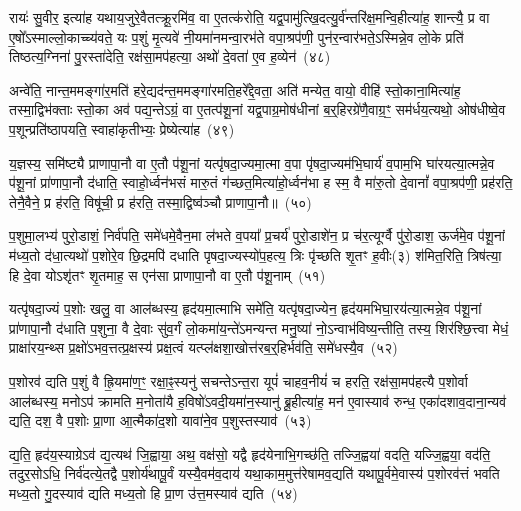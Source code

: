 रायः॑ सु॒वीर॒ इत्या॑ह यथाय॒जुरे॒वैतत्क्रू॒रमि॑व॒ वा ए॒तत्क॑रोति॒ यद्व॒पामु॑त्खि॒दत्यु॒र्व॑न्तरि॑क्ष॒मन्वि॒हीत्या॑ह॒ शान्त्यै॒ प्र वा ए॒षो᳚\-ऽस्माल्लो॒काच्च्य॑वते॒ यः प॒शुं मृ॒त्यवे॑ नी॒यमा॑नमन्वा॒रभ॑ते वपा॒श्रप॑णी॒ पुन॑र॒न्वार॑भते॒\-ऽस्मिन्ने॒व लो॒के प्रति॑ तिष्ठत्य॒ग्निना॑ पु॒रस्ता॑देति॒ रक्ष॑सा॒मप॑हत्या॒ अथो॑ दे॒वता॑ ए॒व ह॒व्येन॑~(४८)\ip

अन्वे॑ति॒ नान्त॒ममङ्गा॑र॒मति॑ हरे॒द्यद॑न्त॒ममङ्गा॑रमति॒हरे᳚द्दे॒वता॒ अति॑ मन्येत॒ वायो॒ वीहि॑ स्तो॒काना॒मित्या॑ह॒ तस्मा॒द्विभ॑क्ताः स्तो॒का अव॑ पद्य॒न्ते\-ऽग्रं॒ वा ए॒तत्प॑शू॒नां यद्व॒पाग्र॒मोष॑धीनां ब॒र्॒\mbox{}हिरग्रे॑णै॒वाग्र॒ꣳ॒ सम॑र्धय॒त्यथो॒ ओष॑धीष्वे॒व प॒शून्प्रति॑\-ष्ठापयति॒ स्वाहा॑कृतीभ्यः॒ प्रेष्येत्या॑ह~(४९)\ip

य॒ज्ञस्य॒ समि॑ष्ट्यै प्राणापा॒नौ वा ए॒तौ प॑शू॒नां यत्पृ॑षदा॒ज्यमा॒त्मा व॒पा पृ॑षदा॒ज्यम॑भि॒घार्य॑ व॒पाम॒भि घा॑रयत्या॒त्मन्ने॒व प॑शू॒नां प्रा॑णापा॒नौ द॑धाति॒ स्वाहो॒र्ध्वन॑भसं मारु॒तं ग॑च्छत॒मित्या॑हो॒र्ध्वन॑भा ह स्म॒ वै मा॑रु॒तो दे॒वानां᳚ वपा॒श्रप॑णी॒ प्रह॑रति॒ तेनै॒वैने॒ प्र ह॑रति॒ विषू॑ची॒ प्र ह॑रति॒ तस्मा॒द्विष्व॑ञ्चौ प्राणापा॒नौ॥~(५०)\ip

{\anuvakamend[{स्वधि॑तिश्चै॒वाच्छि॑न्नो ह॒व्येने॒ष्येत्या॑ह॒ षट्च॑त्वारिꣳशच्च}]}

प॒शुमा॒लभ्य॑ पुरो॒डाशं॒ निर्व॑पति॒ समे॑धमे॒वैन॒मा ल॑भते व॒पया᳚ प्र॒चर्य॑ पुरो॒डाशे॑न॒ प्र च॑र॒त्यूर्ग्वै पु॑रो॒डाश॒ ऊर्ज॑मे॒व प॑शू॒नां म॑ध्य॒तो द॑धा॒त्यथो॑ प॒शोरे॒व छि॒द्रमपि॑ दधाति पृषदा॒ज्यस्यो॑प॒हत्य॒ त्रिः पृ॑च्छति शृ॒तꣳ ह॒वीः(३) श॑मित॒रिति॒ त्रिष॑त्या॒ हि दे॒वा यो\-ऽशृ॑तꣳ शृ॒तमाह॒ स एन॑सा प्राणापा॒नौ वा ए॒तौ प॑शू॒नाम्~(५१)\ip

यत्पृ॑षदा॒ज्यं प॒शोः खलु॒ वा आल॑ब्धस्य॒ हृद॑यमा॒त्माभि समे॑ति॒ यत्पृ॑षदा॒ज्येन॒ हृद॑यमभिघा॒रय॑त्या॒त्मन्ने॒व प॑शू॒नां प्रा॑णापा॒नौ द॑धाति प॒शुना॒ वै दे॒वाः सु॑व॒र्गं लो॒कमा॑य॒न्ते॑\-ऽमन्यन्त मनु॒ष्या॑ नो॒\-ऽन्वाभ॑विष्य॒न्तीति॒ तस्य॒ शिर॑श्छि॒त्त्वा मेधं॒ प्राक्षा॑रय॒न्थ्स प्र॒क्षो॑\-ऽभव॒त्तत्प्र॒क्षस्य॑ प्रक्ष॒त्वं यत्प्ल॑क्षशा॒खोत्त॑रब॒र्॒\mbox{}हिर्भव॑ति॒ समे॑धस्यै॒व~(५२)\ip

प॒शोरव॑ द्यति प॒शुं वै ह्रि॒यमा॑ण॒ꣳ॒ रक्षा॒ꣴ॒स्यनु॑ सचन्ते\-ऽन्त॒रा यूपं॑ चाहव॒नीयं॑ च हरति॒ रक्ष॑सा॒मप॑हत्यै प॒शोर्वा आल॑ब्धस्य॒ मनो\-ऽप॑ क्रामति म॒नोता॑यै ह॒विषो॑\-ऽवदी॒यमा॑न॒स्यानु॑ ब्रू॒हीत्या॑ह॒ मन॑ ए॒वास्याव॑ रुन्ध॒ एका॑\-दशाव॒दाना॒न्यव॑ द्यति॒ दश॒ वै प॒शोः प्रा॒णा आ॒त्मैका॑द॒शो यावा॑ने॒व प॒शुस्तस्याव॑~(५३)\ip

द्य॒ति॒ हृद॑य॒स्याग्रे\-ऽव॑ द्य॒त्यथ॑ जि॒ह्वाया॒ अथ॒ वक्ष॑सो॒ यद्वै हृद॑येनाभि॒गच्छ॑ति॒ तज्जि॒ह्वया॑ वदति॒ यज्जि॒ह्वया॒ वद॑ति॒ तदुर॒सो\-ऽधि॒ निर्व॑दत्ये॒तद्वै प॒शोर्य॑थापू॒र्वं यस्यै॒वम॑व॒दाय॑ यथा॒काम॒मुत्त॑रेषामव॒द्यति॑ यथापू॒र्वमे॒वास्य॑ प॒शोरव॑त्तं भवति मध्य॒तो गु॒दस्याव॑ द्यति मध्य॒तो हि प्रा॒ण उ॑त्त॒मस्याव॑ द्यति~(५४)\ip

